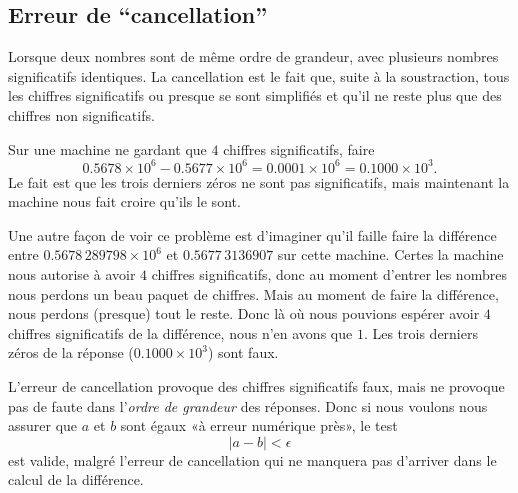 \subsection{Erreur de ``cancellation''}

Lorsque deux nombres sont de même ordre de grandeur, avec plusieurs nombres significatifs identiques. La cancellation est le fait que, suite à la soustraction, tous les chiffres significatifs ou presque se sont simplifiés et qu'il ne reste plus que des chiffres non significatifs. 

\begin{example}
    Sur une machine ne gardant que \( 4\) chiffres significatifs, faire
    \begin{equation}
        0.5678\times 10^6-0.5677\times 10^6 = 0.0001\times 10^6=0.1000\times 10^3.
    \end{equation}
    Le fait est que les trois derniers zéros ne sont pas significatifs, mais maintenant la machine nous fait croire qu'ils le sont.

    Une autre façon de voir ce problème est d'imaginer qu'il faille faire la différence entre \( 0.5678\,289798\times 10^6\) et \( 0.5677\,3136907\) sur cette machine. Certes la machine nous autorise à avoir \( 4\) chiffres significatifs, donc au moment d'entrer les nombres nous perdons un beau paquet de chiffres. Mais au moment de faire la différence, nous perdons (presque) tout le reste. Donc là où nous pouvions espérer avoir \( 4\) chiffres significatifs de la différence, nous n'en avons que \( 1\). Les trois derniers zéros de la réponse (\( 0.1000\times 10^3\)) sont faux.
\end{example}

\begin{remark}  \label{REMooRQIJooNLdAZE}
    L'erreur de cancellation provoque des chiffres significatifs faux, mais ne provoque pas de faute dans l'\emph{ordre de grandeur} des réponses. Donc si nous voulons nous assurer que \( a\) et \( b\) sont égaux «à erreur numérique près», le test
    \begin{equation}
        | a-b |<\epsilon
    \end{equation}
    est valide, malgré l'erreur de cancellation qui ne manquera pas d'arriver dans le calcul de la différence.
\end{remark}

